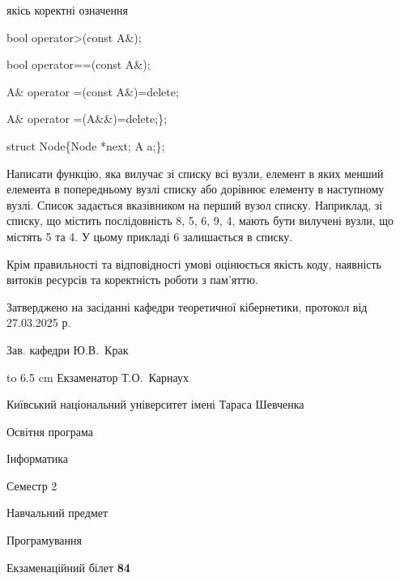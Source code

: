 \documentclass[12pt, ukrainian]{article}
\begin{document}
{\quad  якісь коректні означення 

\quad  bool operator>(const A\&); 

\quad  bool operator==(const A\&); 

\quad A\& operator =(const A\&)=delete; 

\quad  A\& operator =(A\&\&)=delete;\};

struct Node\{Node *next; A a;\};

 Написати функцію, яка вилучає зі списку всі вузли, елемент в яких менший елемента в попередньому вузлі списку або дорівнює елементу в наступному вузлі. Список задається вказівником на перший вузол списку. Наприклад, зі списку, що містить послідовність 8, 5, 6, 9, 4, мають бути вилучені вузли, що містять 5 та 4. У цьому прикладі 6 залишається в списку.

Крім правильності та відповідності умові оцінюється якість коду, наявність витоків ресурсів та коректність роботи з пам'яттю. 

}
{\smallskip\smallskip \begin {scriptsize} Затверджено на засіданні кафедри теоретичної кібернетики, протокол   від   27.03.2025 р.\par\smallskip\smallskip\smallskip\smallskip
{\parbox {6.5 cm} {Зав. кафедри \dotfill Ю.В.~Крак}}\hspace {0.7cm} {\hbox to 6.5 cm { Екзаменатор \dotfill Т.О.~Карнаух}} \end{scriptsize}}
\newpage
{{\begin {scriptsize}\par
{ \center  Київський національний університет імені Тараса Шевченка \par}
{\parbox {5 cm}{Освітня програма \hfill}{\parbox {7 cm}{Інформатика\hfill}}\parbox {6 cm}{\hfill Семестр 2}}\par
{\parbox {5 cm} {Навчальний предмет \hfill}\parbox {7 cm}{Програмування \hfill}\parbox {6cm}{\hfill}\par}\vspace{-15pt} \end{scriptsize}}{\center Екзаменаційний білет \No \textbf { 84 }\par}}
\end{document}

